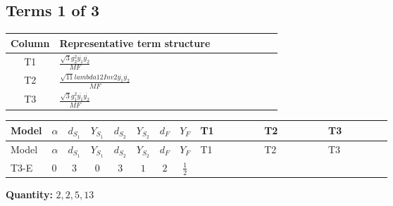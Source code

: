 \documentclass[8pt]{article}
\begin{document}
\begin{landscape}
\subsection*{Terms 1 of 3}
\begin{center}
\begin{tabular}{@{}c >{\raggedright\arraybackslash}p{0.82\linewidth}@{}}
\toprule
Column & Representative term structure \\
\midrule
T1 & \(\displaystyle \frac{\sqrt{3} g_{2}^{2} \overline{y_{1}} \overline{y_{2}}}{MF}\) \\
\midrule
T2 & \(\displaystyle \frac{\sqrt{11} lambda12Inv2 \overline{y_{1}} \overline{y_{2}}}{MF}\) \\
\midrule
T3 & \(\displaystyle \frac{\sqrt{3} g_{1}^{2} \overline{y_{1}} \overline{y_{2}}}{MF}\) \\
\midrule
\bottomrule
\end{tabular}
\end{center}
\smallskip
\tiny
\begin{longtable}{@{}llcccccc >{\raggedright\arraybackslash}p{0.21\linewidth} >{\raggedright\arraybackslash}p{0.21\linewidth} >{\raggedright\arraybackslash}p{0.21\linewidth}@{}}
\toprule
Model & $\alpha$ & $d_{S_1}$ & $Y_{S_1}$ & $d_{S_2}$ & $Y_{S_2}$ & $d_F$ & $Y_F$ & T1 & T2 & T3 \\
\midrule
\endfirsthead
\toprule
Model & $\alpha$ & $d_{S_1}$ & $Y_{S_1}$ & $d_{S_2}$ & $Y_{S_2}$ & $d_F$ & $Y_F$ & T1 & T2 & T3 \\
\midrule
\endhead
T3-E & $0$ & $3$ & $0$ & $3$ & $1$ & $2$ & $\frac{1}{2}$ & \scriptsize\adjustbox{max width=\linewidth}{$\begin{gathered} - \frac{49 \sqrt{3} g_{2}^{2} \overline{y_{1}} \overline{y_{2}}}{24 MF}\end{gathered}$} & \scriptsize\adjustbox{max width=\linewidth}{$\begin{gathered} - \frac{3 \sqrt{11} lambda12Inv2 \overline{y_{1}} \overline{y_{2}}}{22 MF}\end{gathered}$} & \scriptsize\adjustbox{max width=\linewidth}{$\begin{gathered} - \frac{\sqrt{3} g_{1}^{2} \overline{y_{1}} \overline{y_{2}}}{8 MF}\end{gathered}$} \\
\midrule
\bottomrule
\end{longtable}
\clearpage
\noindent\textbf{Quantity: }$\mathrm{2,2,5,13}$\par\smallskip

\end{landscape}
\end{document}
